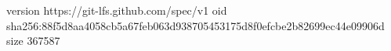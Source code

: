 version https://git-lfs.github.com/spec/v1
oid sha256:88f5d8aa4058cb5a67feb063d938705453175d8f0efcbe2b82699ec44e09906d
size 367587
